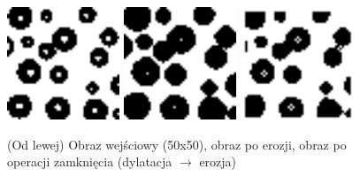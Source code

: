 \documentclass[final,a4paper,openany,12pt]{mwbk}
\begin{document}
\begin{figure}[H]
	\begin{center}
		\includegraphics[width=0.3\textwidth]{1/1Bin_Cl_Original}
		\includegraphics[width=0.3\textwidth]{1/1Bin_Cl_D_Result}
		\includegraphics[width=0.3\textwidth]{1/1Bin_Cl_DE_Result}
	\end{center}
	\caption{(Od lewej) Obraz wejściowy (50x50), obraz po erozji, obraz po operacji zamknięcia (dylatacja $\rightarrow$ erozja)}
\end{figure}
\end{document}

